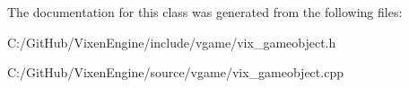 The documentation for this class was generated from the following files\+:\begin{DoxyCompactItemize}
\item 
C\+:/\+Git\+Hub/\+Vixen\+Engine/include/vgame/vix\+\_\+gameobject.\+h\item 
C\+:/\+Git\+Hub/\+Vixen\+Engine/source/vgame/vix\+\_\+gameobject.\+cpp\end{DoxyCompactItemize}
